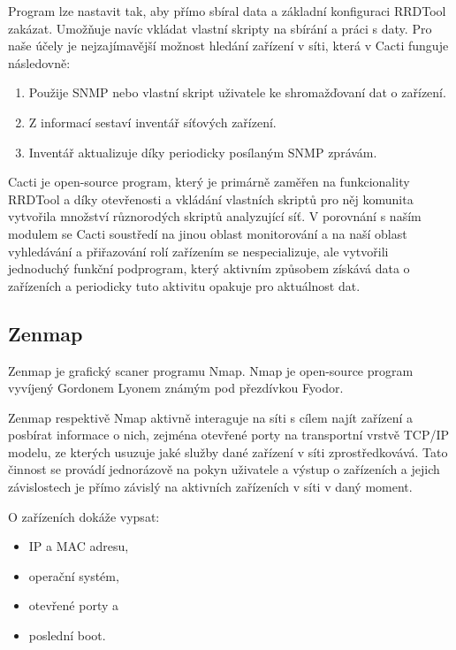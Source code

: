 \documentclass[thesis=B,czech,hidelinks]{FITthesis}[2019/03/21]
\begin{document}
       Program lze nastavit tak, aby přímo sbíral data a základní konfiguraci RRDTool zakázat. Umožňuje navíc vkládat vlastní skripty na sbírání a práci s daty. Pro naše účely je nejzajímavější možnost hledání zařízení v síti, která v Cacti funguje následovně:
        \begin{enumerate}
            \item Použije SNMP nebo vlastní skript uživatele ke shromažďovaní dat o zařízení.
            \item Z informací sestaví inventář síťových zařízení.
            \item Inventář aktualizuje díky periodicky posílaným SNMP zprávám.
        \end{enumerate}
        
        Cacti je open-source program, který je primárně zaměřen na funkcionality RRDTool a díky otevřenosti a vkládání vlastních skriptů pro něj komunita vytvořila množství různorodých skriptů analyzující síť. V porovnání s naším modulem se Cacti soustředí na jinou oblast monitorování a na naší oblast vyhledávání a přiřazování rolí zařízením se nespecializuje, ale vytvořili jednoduchý funkční podprogram, který aktivním způsobem získává data o zařízeních a periodicky tuto aktivitu opakuje pro aktuálnost dat.
        
        \subsection{Zenmap}
        Zenmap \cite{Zenmap} je grafický scaner programu Nmap. Nmap je open-source program vyvíjený Gordonem Lyonem známým pod přezdívkou Fyodor. 
        
        Zenmap respektivě Nmap aktivně interaguje na síti s cílem najít zařízení a posbírat informace o nich, zejména otevřené porty na transportní vrstvě TCP/IP modelu, ze kterých usuzuje jaké služby dané zařízení v síti zprostředkovává. Tato činnost se provádí jednorázově na pokyn uživatele a výstup o zařízeních a jejich závislostech je přímo závislý na aktivních zařízeních v síti v daný moment. 
        
        O zařízeních dokáže vypsat:
        \begin{itemize}
            \item IP a MAC adresu,
            \item operační systém,
            \item otevřené porty a
            \item poslední boot.
        \end{itemize}
        
\end{document}
